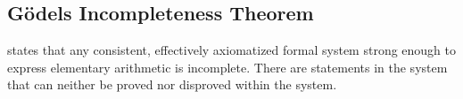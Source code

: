 \documentclass[
../EiKI_Summary.tex,
]
{subfiles}
\begin{document}
\subsection{Gödels Incompleteness Theorem}
 states that any consistent, effectively axiomatized formal system strong enough to express elementary arithmetic is incomplete. There are statements in the system that can neither be proved nor disproved within the system.
\end{document}
